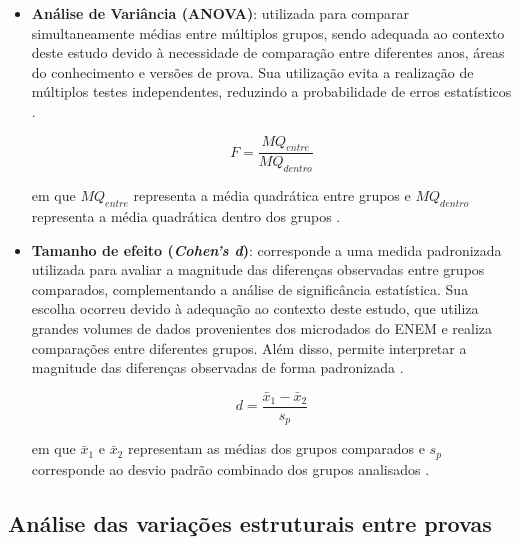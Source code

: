 \documentclass[a4paper,10pt, twocolumn]{article}
\begin{document}
\begin{itemize}

\item \textbf{Análise de Variância (ANOVA)}: utilizada para comparar simultaneamente médias entre múltiplos grupos, sendo adequada ao contexto deste estudo devido à necessidade de comparação entre diferentes anos, áreas do conhecimento e versões de prova. Sua utilização evita a realização de múltiplos testes independentes, reduzindo a probabilidade de erros estatísticos \cite{field2018discovering}.

\begin{equation}
F=
\frac{MQ_{entre}}
{MQ_{dentro}}
\end{equation}

em que $MQ_{entre}$ representa a média quadrática entre grupos e $MQ_{dentro}$ representa a média quadrática dentro dos grupos \cite{libretexts_anova}.

\item \textbf{Tamanho de efeito (\textit{Cohen's d})}: corresponde a uma medida padronizada utilizada para avaliar a magnitude das diferenças observadas entre grupos comparados, complementando a análise de significância estatística. Sua escolha ocorreu devido à adequação ao contexto deste estudo, que utiliza grandes volumes de dados provenientes dos microdados do ENEM e realiza comparações entre diferentes grupos. Além disso, permite interpretar a magnitude das diferenças observadas de forma padronizada \cite{cohen1988statistical}.

\begin{equation}
d=
\frac{\bar{x}_1-\bar{x}_2}
{s_p}
\end{equation}

em que $\bar{x}_1$ e $\bar{x}_2$ representam as médias dos grupos comparados e $s_p$ corresponde ao desvio padrão combinado dos grupos analisados \cite{jim_cohensd}.

\end{itemize}


\subsection{Análise das variações estruturais entre provas} 
\end{document}
